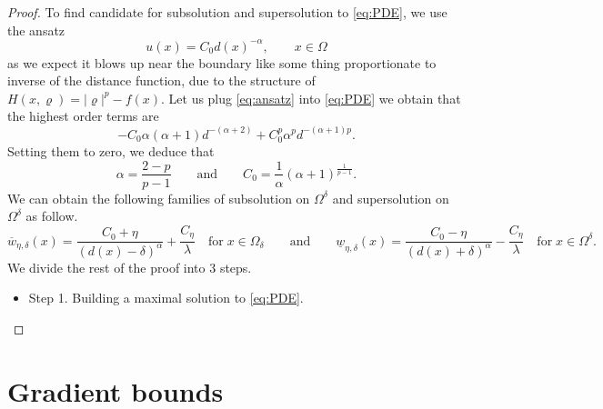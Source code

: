 \documentclass[11pt,reqno]{amsart}
\numberwithin{figure}{section}
\theoremstyle{plain}
\theoremstyle{remark}
\numberwithin{equation}{section}
\begin{document}
\begin{appendices}
\begin{proof}
To find candidate for subsolution and supersolution to \eqref{eq:PDE}, we use the ansatz
\begin{equation}\label{eq:ansatz}
    u(x) = C_0 d(x)^{-\alpha}, \qquad x\in \Omega
\end{equation}
as we expect it blows up near the boundary like some thing proportionate to inverse of the distance function, due to the structure of $H(x,\varrho) = |\varrho|^p - f(x)$. Let us plug \eqref{eq:ansatz} into \eqref{eq:PDE} we obtain that the highest order terms are
\begin{equation*}
        -C_0 \alpha(\alpha+1)d^{-(\alpha+2)} + C_0^p \alpha^p d^{-(\alpha+1)p}.
\end{equation*}
Setting them to zero, we deduce that
\begin{equation*}
    \displaystyle\alpha = \frac{2-p}{p-1} \qquad\text{and}\qquad C_0 = \frac{1}{\alpha}(\alpha+1)^\frac{1}{p-1}.
\end{equation*}
We can obtain the following families of subsolution on $\Omega^\delta$ and supersolution on $\Omega^\delta$ as follow.
\begin{equation*}
        \overline{w}_{\eta,\delta}(x) = \frac{C_0+\eta}{(d(x)-\delta)^\alpha} +\frac{C_\eta}{\lambda} \quad\text{for}\;x\in \Omega_\delta \qquad\text{and}\qquad \underline{w}_{\eta,\delta}(x) = \frac{C_0-\eta}{(d(x)+\delta)^\alpha} -\frac{C_\eta}{\lambda} \quad\text{for}\;x\in \Omega^\delta.
\end{equation*}
We divide the rest of the proof into 3 steps.
\begin{itemize}
    \item Step 1. Building a maximal solution to \eqref{eq:PDE}. 
\end{itemize}
\end{proof}




\section{Gradient bounds}

\end{appendices}
\end{document}
